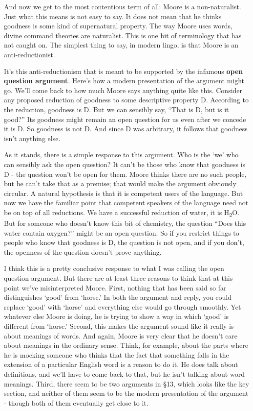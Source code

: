 \documentclass[
]{article}
\begin{document}
And now we get to the most contentious term of all: Moore is a
non-naturalist. Just what this means is not easy to say. It does not
mean that he thinks goodness is some kind of supernatural property. The
way Moore uses words, divine command theories are naturalist. This is
one bit of terminology that has not caught on. The simplest thing to
say, in modern lingo, is that Moore is an anti-reductionist.

It's this anti-reductionism that is meant to be supported by the
infamous \textbf{open question argument}. Here's how a modern
presentation of the argument might go. We'll come back to how much Moore
says anything quite like this. Consider any proposed reduction of
goodness to some descriptive property D. According to the reduction,
goodness is D. But we can sensibly say, ``That is D, but is it good?''
Its goodness might remain an open question for us even after we concede
it is D. So goodness is not D. And since D was arbitrary, it follows
that goodness isn't anything else.

As it stands, there is a simple response to this argument. Who is the
`we' who can sensibly ask the open question? It can't be those who know
that goodness is D - the question won't be open for them. Moore thinks
there are no such people, but he can't take that as a premise; that
would make the argument obviously circular. A natural hypothesis is that
it is competent users of the language. But now we have the familiar
point that competent speakers of the language need not be on top of all
reductions. We have a successful reduction of water, it is
H\textsubscript{2}O. But for someone who doesn't know this bit of
chemistry, the question ``Does this water contain oxygen?'' might be an
open question. So if you restrict things to people who know that
goodness is D, the question is not open, and if you don't, the openness
of the question doesn't prove anything.

I think this is a pretty conclusive response to what I was calling the
open question argument. But there are at least three reasons to think
that at this point we've misinterpreted Moore. First, nothing that has
been said so far distinguishes `good' from `horse.' In both the argument
and reply, you could replace `good' with `horse' and everything else
would go through smoothly. Yet whatever else Moore is doing, he is
trying to show a way in which `good' is different from `horse.' Second,
this makes the argument sound like it really is about meanings of words.
And again, Moore is very clear that he doesn't care about meanings in
the ordinary sense. Think, for example, about the parts where he is
mocking someone who thinks that the fact that something falls in the
extension of a particular English word is a reason to do it. He does
talk about definitions, and we'll have to come back to that, but he
isn't talking about word meanings. Third, there seem to be two arguments
in §13, which looks like the key section, and neither of them seem to be
the modern presentation of the argument - though both of them eventually
get close to it.
\end{document}
